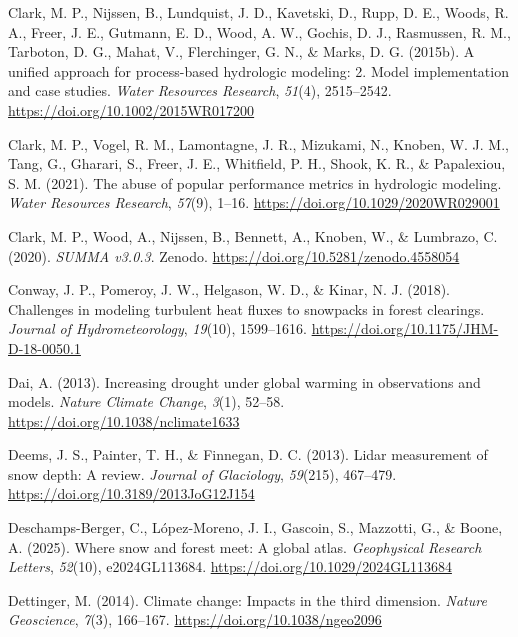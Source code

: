 \documentclass[
  letterpaper,
]{tex/uofsthesis-cs}
\newlength{\cslhangindent}
\newenvironment{CSLReferences}[2] %
 {\begin{list}{}{%
  \setlength{\itemindent}{0pt}
  \setlength{\leftmargin}{0pt}
  \setlength{\parsep}{0pt}
  \ifodd #1
   \setlength{\leftmargin}{\cslhangindent}
   \setlength{\itemindent}{-1\cslhangindent}
  \fi
  \setlength{\itemsep}{#2\baselineskip}}}
 {\end{list}}
\begin{document}
\begin{CSLReferences}{1}{0}
Clark, M. P., Nijssen, B., Lundquist, J. D., Kavetski, D., Rupp, D. E.,
Woods, R. A., Freer, J. E., Gutmann, E. D., Wood, A. W., Gochis, D. J.,
Rasmussen, R. M., Tarboton, D. G., Mahat, V., Flerchinger, G. N., \&
Marks, D. G. (2015b). A unified approach for process-based hydrologic
modeling: 2. {Model} implementation and case studies. \emph{Water
Resources Research}, \emph{51}(4), 2515--2542.
\url{https://doi.org/10.1002/2015WR017200}

Clark, M. P., Vogel, R. M., Lamontagne, J. R., Mizukami, N., Knoben, W.
J. M., Tang, G., Gharari, S., Freer, J. E., Whitfield, P. H., Shook, K.
R., \& Papalexiou, S. M. (2021). The abuse of popular performance
metrics in hydrologic modeling. \emph{Water Resources Research},
\emph{57}(9), 1--16. \url{https://doi.org/10.1029/2020WR029001}

Clark, M. P., Wood, A., Nijssen, B., Bennett, A., Knoben, W., \&
Lumbrazo, C. (2020). \emph{{SUMMA} v3.0.3}. Zenodo.
\url{https://doi.org/10.5281/zenodo.4558054}

Conway, J. P., Pomeroy, J. W., Helgason, W. D., \& Kinar, N. J. (2018).
Challenges in modeling turbulent heat fluxes to snowpacks in forest
clearings. \emph{Journal of Hydrometeorology}, \emph{19}(10),
1599--1616. \url{https://doi.org/10.1175/JHM-D-18-0050.1}

Dai, A. (2013). Increasing drought under global warming in observations
and models. \emph{Nature Climate Change}, \emph{3}(1), 52--58.
\url{https://doi.org/10.1038/nclimate1633}

Deems, J. S., Painter, T. H., \& Finnegan, D. C. (2013). Lidar
measurement of snow depth: {A} review. \emph{Journal of Glaciology},
\emph{59}(215), 467--479. \url{https://doi.org/10.3189/2013JoG12J154}

Deschamps-Berger, C., López-Moreno, J. I., Gascoin, S., Mazzotti, G., \&
Boone, A. (2025). Where snow and forest meet: A global atlas.
\emph{Geophysical Research Letters}, \emph{52}(10), e2024GL113684.
\url{https://doi.org/10.1029/2024GL113684}

Dettinger, M. (2014). Climate change: {Impacts} in the third dimension.
\emph{Nature Geoscience}, \emph{7}(3), 166--167.
\url{https://doi.org/10.1038/ngeo2096}


\end{CSLReferences}
\end{document}
